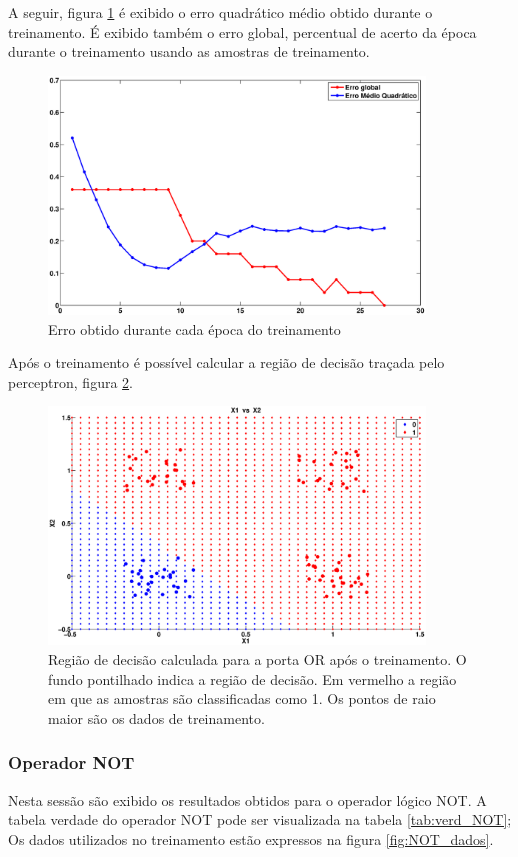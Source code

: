 \documentclass[12pt,journal,onecolumn]{IEEEtran}
\begin{document}
A seguir, figura \ref{fig:OR_err} é exibido o erro quadrático médio obtido durante o
treinamento.
É exibido também o erro global, percentual de acerto da época durante o
treinamento usando as amostras de treinamento.
\begin{figure}[!htbp]
	\centering
	\includegraphics[width=10cm, trim = 3cm 1cm 3cm 1cm, clip=true
	]{eps/or/orErr.eps}
	\caption{Erro obtido durante cada época do treinamento}
	\label{fig:OR_err}
\end{figure} 

Após o treinamento é possível calcular a região de decisão traçada pelo
perceptron, figura \ref{fig:ORReg}.

\begin{figure}[!htbp]
	\centering
	\includegraphics[width=10cm, trim = 3cm 1cm 3cm 1cm, clip=true
	]{eps/or/ORRegiao.eps}
	\caption{Região de decisão calculada para a porta OR após o treinamento. O
	fundo pontilhado indica a região de decisão. Em vermelho a região em que as
	amostras são classificadas como 1. Os pontos de raio maior são os dados de
	treinamento.}
	\label{fig:ORReg}
\end{figure} 


\subsubsection{Operador NOT}
Nesta sessão são exibido os resultados obtidos para o operador lógico NOT.
A tabela verdade do operador NOT pode ser visualizada na
tabela \ref{tab:verd_NOT};
Os dados utilizados no treinamento estão expressos na figura \ref{fig:NOT_dados}.
\end{document}

